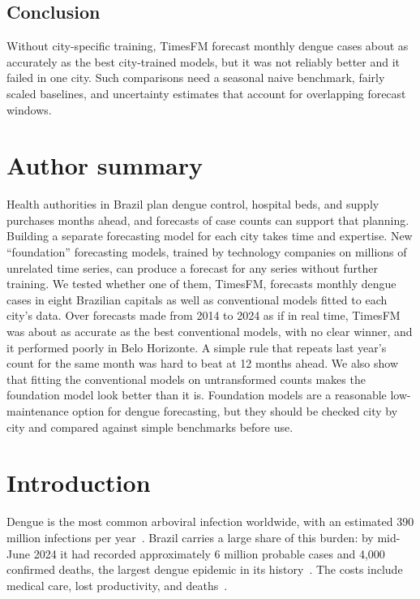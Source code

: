 \documentclass[10pt,letterpaper]{article}
\begin{document}
\subsection*{Conclusion}
Without city-specific training, TimesFM forecast monthly dengue cases about as accurately as the best city-trained models, but it was not reliably better and it failed in one city. Such comparisons need a seasonal naive benchmark, fairly scaled baselines, and uncertainty estimates that account for overlapping forecast windows.

\section*{Author summary}
Health authorities in Brazil plan dengue control, hospital beds, and supply purchases months ahead, and forecasts of case counts can support that planning. Building a separate forecasting model for each city takes time and expertise. New ``foundation'' forecasting models, trained by technology companies on millions of unrelated time series, can produce a forecast for any series without further training. We tested whether one of them, TimesFM, forecasts monthly dengue cases in eight Brazilian capitals as well as conventional models fitted to each city's data. Over forecasts made from 2014 to 2024 as if in real time, TimesFM was about as accurate as the best conventional models, with no clear winner, and it performed poorly in Belo Horizonte. A simple rule that repeats last year's count for the same month was hard to beat at 12 months ahead. We also show that fitting the conventional models on untransformed counts makes the foundation model look better than it is. Foundation models are a reasonable low-maintenance option for dengue forecasting, but they should be checked city by city and compared against simple benchmarks before use.

\clearpage
{}
\linenumbers

\section*{Introduction}
Dengue is the most common arboviral infection worldwide, with an estimated 390 million infections per year~\cite{Bhatt2013}. Brazil carries a large share of this burden: by mid-June 2024 it had recorded approximately 6 million probable cases and 4,000 confirmed deaths, the largest dengue epidemic in its history~\cite{GurgelGoncalves2024}. The costs include medical care, lost productivity, and deaths~\cite{Siqueira2022}.
\end{document}
